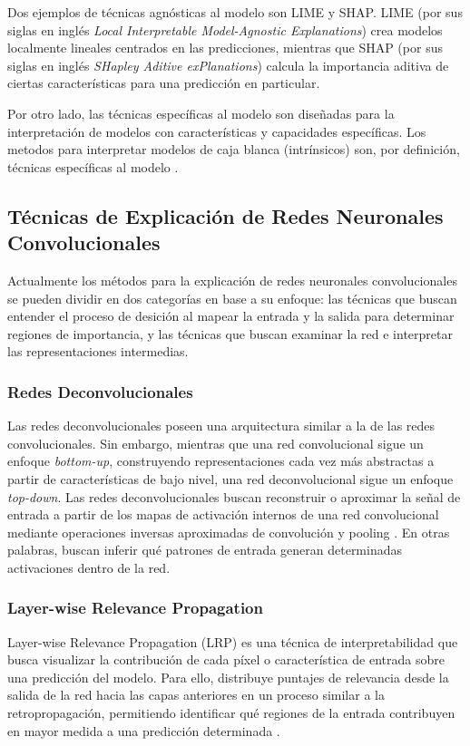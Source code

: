 Dos ejemplos de técnicas agnósticas al modelo son LIME y SHAP. LIME (por sus siglas en inglés 
\textit{Local Interpretable Model-Agnostic Explanations}) crea modelos localmente lineales centrados
en las predicciones, mientras que SHAP (por sus siglas en inglés \textit{SHapley Aditive exPlanations})
calcula la importancia aditiva de ciertas características para una predicción en particular.
\medskip

Por otro lado, las técnicas específicas al modelo son diseñadas para la interpretación de modelos con 
características y capacidades específicas. Los metodos para interpretar modelos de caja blanca (intrínsicos) son,
por definición, técnicas específicas al modelo \parencite{adadi2018peeking}.

\subsection{Técnicas de Explicación de Redes Neuronales Convolucionales}
Actualmente los métodos para la explicación de redes neuronales convolucionales se pueden dividir
en dos categorías en base a su enfoque: las técnicas que buscan entender el proceso de desición
al mapear la entrada y la salida para determinar regiones de importancia, y las técnicas que
buscan examinar la red e interpretar las representaciones intermedias.

\subsubsection{Redes Deconvolucionales}
Las redes deconvolucionales poseen una arquitectura similar a la de las redes convolucionales. 
Sin embargo, mientras que una red convolucional sigue un enfoque \textit{bottom-up}, 
construyendo representaciones cada vez más abstractas a partir de características de bajo nivel, 
una red deconvolucional sigue un enfoque \textit{top-down}. Las redes deconvolucionales buscan 
reconstruir o aproximar la señal de entrada a partir de los mapas de activación internos de una 
red convolucional mediante operaciones inversas aproximadas de convolución y pooling 
\parencite{zeiler2010deconvolutional}. En otras palabras, buscan inferir qué patrones de 
entrada generan determinadas activaciones dentro de la red.

\subsubsection{Layer-wise Relevance Propagation}
Layer-wise Relevance Propagation (LRP) es una técnica de interpretabilidad que busca visualizar 
la contribución de cada píxel o característica de entrada sobre una predicción del modelo. 
Para ello, distribuye puntajes de relevancia desde la salida de la red hacia las capas 
anteriores en un proceso similar a la retropropagación, permitiendo identificar qué regiones de 
la entrada contribuyen en mayor medida a una predicción determinada \parencite{bach2015pixel}.

